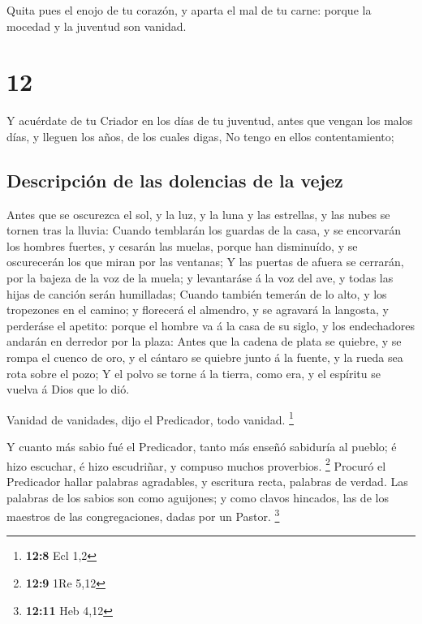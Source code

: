  Quita pues el enojo de tu corazón, y aparta el mal de tu
carne: porque la mocedad y la juventud son vanidad.

\hypertarget{section-11}{%
\section{12}\label{section-11}}

 Y acuérdate de tu Criador en los días de tu juventud, antes
que vengan los malos días, y lleguen los años, de los cuales digas, No
tengo en ellos contentamiento;

\hypertarget{descripciuxf3n-de-las-dolencias-de-la-vejez}{%
\subsection{Descripción de las dolencias de la
vejez}\label{descripciuxf3n-de-las-dolencias-de-la-vejez}}

 Antes que se oscurezca el sol, y la luz, y la luna y las
estrellas, y las nubes se tornen tras la lluvia:  Cuando
temblarán los guardas de la casa, y se encorvarán los hombres fuertes, y
cesarán las muelas, porque han disminuído, y se oscurecerán los que
miran por las ventanas;  Y las puertas de afuera se
cerrarán, por la bajeza de la voz de la muela; y levantaráse á la voz
del ave, y todas las hijas de canción serán humilladas; 
Cuando también temerán de lo alto, y los tropezones en el camino; y
florecerá el almendro, y se agravará la langosta, y perderáse el
apetito: porque el hombre va á la casa de su siglo, y los endechadores
andarán en derredor por la plaza:  Antes que la cadena de
plata se quiebre, y se rompa el cuenco de oro, y el cántaro se quiebre
junto á la fuente, y la rueda sea rota sobre el pozo;  Y el
polvo se torne á la tierra, como era, y el espíritu se vuelva á Dios que
lo dió.

 Vanidad de vanidades, dijo el Predicador, todo vanidad.
\footnote{\textbf{12:8} Ecl 1,2}

 Y cuanto más sabio fué el Predicador, tanto más enseñó
sabiduría al pueblo; é hizo escuchar, é hizo escudriñar, y compuso
muchos proverbios. \footnote{\textbf{12:9} 1Re 5,12} 
Procuró el Predicador hallar palabras agradables, y escritura recta,
palabras de verdad.  Las palabras de los sabios son como
aguijones; y como clavos hincados, las de los maestros de las
congregaciones, dadas por un Pastor. \footnote{\textbf{12:11} Heb 4,12}

